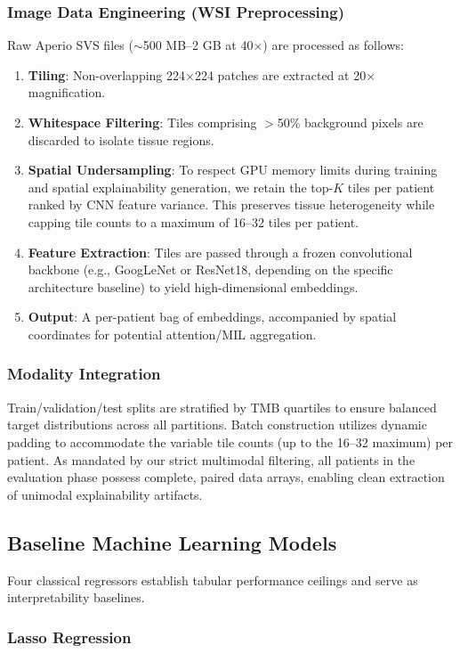 \documentclass[11pt,a4paper]{article}
\begin{document}
\subsubsection{Image Data Engineering (WSI Preprocessing)}
Raw Aperio SVS files ($\sim$500 MB--2 GB at 40$\times$) are processed as follows:
\begin{enumerate}
    \item \textbf{Tiling}: Non-overlapping 224$\times$224 patches are extracted at 20$\times$ magnification.
    \item \textbf{Whitespace Filtering}: Tiles comprising $>$50\% background pixels are discarded to isolate tissue regions.
    \item \textbf{Spatial Undersampling}: To respect GPU memory limits during training and spatial explainability generation, we retain the top-$K$ tiles per patient ranked by CNN feature variance. This preserves tissue heterogeneity while capping tile counts to a maximum of 16--32 tiles per patient.
    \item \textbf{Feature Extraction}: Tiles are passed through a frozen convolutional backbone (e.g., GoogLeNet or ResNet18, depending on the specific architecture baseline) to yield high-dimensional embeddings.
    \item \textbf{Output}: A per-patient bag of embeddings, accompanied by spatial coordinates for potential attention/MIL aggregation.
\end{enumerate}

\subsubsection{Modality Integration}
Train/validation/test splits are stratified by TMB quartiles to ensure balanced target distributions across all partitions. Batch construction utilizes dynamic padding to accommodate the variable tile counts (up to the 16--32 maximum) per patient. As mandated by our strict multimodal filtering, all patients in the evaluation phase possess complete, paired data arrays, enabling clean extraction of unimodal explainability artifacts.

\subsection{Baseline Machine Learning Models}
\label{subsec:baseline_ml}
Four classical regressors establish tabular performance ceilings and serve as interpretability baselines.

\subsubsection{Lasso Regression}
\label{subsubsec:lasso}
\end{document}
